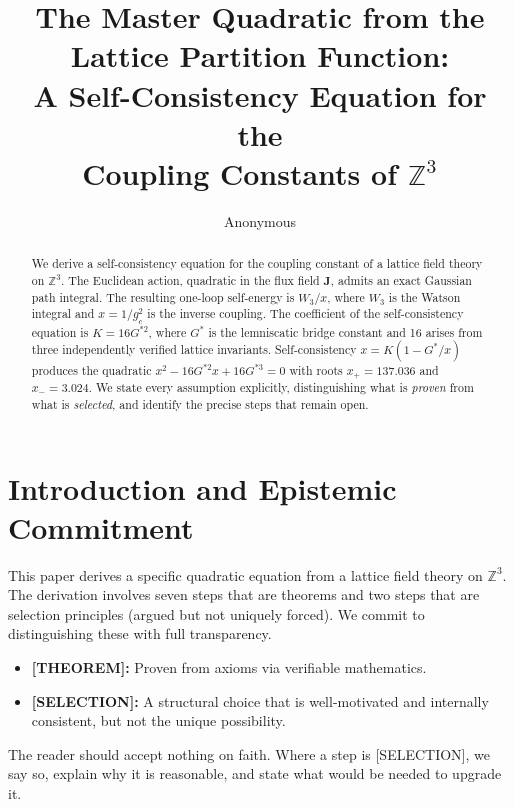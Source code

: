 \documentclass[12pt]{article}
\title{\textbf{The Master Quadratic from the Lattice Partition Function: \\[0.3cm]
A Self-Consistency Equation for the \\
Coupling Constants of $\mathbb{Z}^3$}}
\author{Anonymous}
\date{}
\theoremstyle{definition}
\theoremstyle{remark}
\begin{document}
\maketitle

\begin{abstract}
\noindent We derive a self-consistency equation for the coupling constant of a lattice field theory on $\mathbb{Z}^3$. The Euclidean action, quadratic in the flux field $\mathbf{J}$, admits an exact Gaussian path integral. The resulting one-loop self-energy is $W_3/x$, where $W_3$ is the Watson integral and $x = 1/g_c^2$ is the inverse coupling. The coefficient of the self-consistency equation is $K = 16G^{*2}$, where $G^*$ is the lemniscatic bridge constant and 16 arises from three independently verified lattice invariants. Self-consistency $x = K(1 - G^*/x)$ produces the quadratic $x^2 - 16G^{*2}x + 16G^{*3} = 0$ with roots $x_+ = 137.036$ and $x_- = 3.024$. We state every assumption explicitly, distinguishing what is \emph{proven} from what is \emph{selected}, and identify the precise steps that remain open.
\end{abstract}

\tableofcontents

\section{Introduction and Epistemic Commitment}

This paper derives a specific quadratic equation from a lattice field theory on $\mathbb{Z}^3$. The derivation involves seven steps that are theorems and two steps that are selection principles (argued but not uniquely forced). We commit to distinguishing these with full transparency.

\begin{itemize}[nosep]
    \item \textbf{[THEOREM]:} Proven from axioms via verifiable mathematics.
    \item \textbf{[SELECTION]:} A structural choice that is well-motivated and internally consistent, but not the unique possibility.
\end{itemize}

The reader should accept nothing on faith. Where a step is [SELECTION], we say so, explain why it is reasonable, and state what would be needed to upgrade it.
\end{document}
